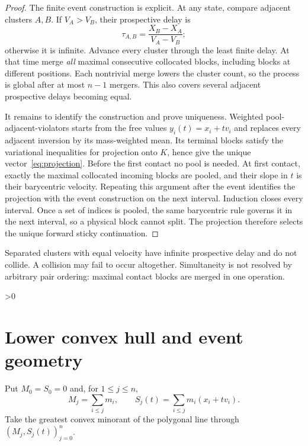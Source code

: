 \documentclass[10pt]{article}
\providecommand{\CRevisionRound}{2}
\begin{document}
\begin{proof}
The finite event construction is explicit.  At any state, compare adjacent
clusters $A,B$.  If $V_A>V_B$, their prospective delay is
\[
 \tau_{A,B}=\frac{X_B-X_A}{V_A-V_B};
\]
otherwise it is infinite.  Advance every cluster through the least finite
delay.  At that time merge \emph{all} maximal consecutive collocated blocks,
including blocks at different positions.  Each nontrivial merge lowers the
cluster count, so the process is global after at most $n-1$ mergers.  This
also covers several adjacent prospective delays becoming equal.

It remains to identify the construction and prove uniqueness.  Weighted
pool-adjacent-violators starts from the free values $y_i(t)=x_i+t v_i$ and
replaces every adjacent inversion by its mass-weighted mean.  Its terminal
blocks satisfy the variational inequalities for projection onto $K$, hence
give the unique vector~\eqref{eq:projection}.  Before the first contact no
pool is needed.  At first contact, exactly the maximal collocated incoming
blocks are pooled, and their slope in $t$ is their barycentric velocity.
Repeating this argument after the event identifies the projection with the
event construction on the next interval.  Induction closes every interval.
Once a set of indices is pooled, the same barycentric rule governs it in the
next interval, so a physical block cannot split.  The projection therefore
selects the unique forward sticky continuation.
\end{proof}

Separated clusters with equal velocity have infinite prospective delay and
do not collide.  A collision may fail to occur altogether.  Simultaneity is
not resolved by arbitrary pair ordering: maximal contact blocks are merged
in one operation.

\ifnum\CRevisionRound>0
\section{Lower convex hull and event geometry}
Put $M_0=S_0=0$ and, for $1\leq j\leq n$,
\begin{equation}\label{eq:cumsum}
 M_j=\sum_{i\leq j}m_i,
 \qquad S_j(t)=\sum_{i\leq j}m_i(x_i+t v_i).
\end{equation}
Take the greatest convex minorant of the polygonal line through
$(M_j,S_j(t))_{j=0}^n$.
\end{document}
